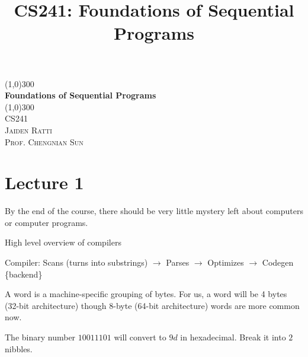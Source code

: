 \documentclass{article}
\title{CS241: Foundations of Sequential Programs}
\begin{document}
\begin{titlepage}
	\begin{center}
    \line(1,0){300}\\
    [0.65cm]
	\huge{\bfseries Foundations of Sequential Programs}\\
	\line(1,0){300}\\
	\textsc{\Large CS241}\\
	\textsc{\Large  Jaiden Ratti}\\
        \textsc{\Large Prof. Chengnian Sun}\\
	[5.5cm]
	\end{center}
\end{titlepage}




\tableofcontents

\pagebreak


\section{Lecture 1}\label{lecture-1}




By the end of the course, there should be very little mystery left about
computers or computer programs.

High level overview of compilers

Compiler: Scans (turns into substrings) \(\to\) Parses \(\to\) Optimizes \(\to\) Codegen \{backend\}






 {
A word is a machine-specific grouping of bytes.
For us, a word will be 4 bytes (32-bit architecture) though 8-byte
(64-bit architecture) words are more common now.
}


The binary number \(10011101\) will convert to \(9d\) in hexadecimal.
Break it into \(2\) nibbles.
\end{document}
